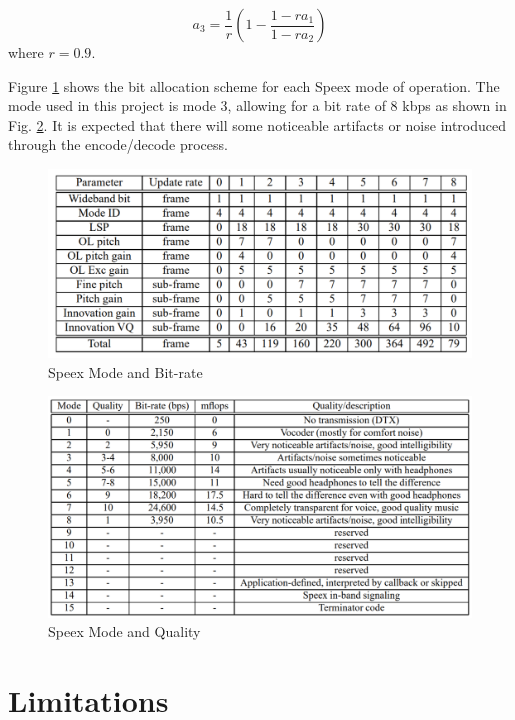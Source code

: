 \documentclass[letterpaper]{article}
\begin{document}
\begin{equation}\label{supp}
    a_3 = \frac{1}{r}\left(1-\frac{1-ra_1}{1-ra_2}\right)
\end{equation}
where $r = 0.9$.

Figure \ref{bitalloctab} shows the bit allocation scheme for each Speex mode of operation. The mode used in this project is mode 3, allowing for a bit rate of 8 kbps as shown in Fig. \ref{qualtab}. It is expected that there will some noticeable artifacts or noise introduced through the encode/decode process.

\begin{figure}[h!]
    \centering
    \includegraphics[width=12cm]{bitalloctable}
    \caption{Speex Mode and Bit-rate~\cite{valin2007speex}}
    \label{bitalloctab}
\end{figure}

\begin{figure}[h!]
    \centering
    \includegraphics[width=12cm]{qualitytable}
    \caption{Speex Mode and Quality~\cite{valin2007speex}}
    \label{qualtab}
\end{figure}

\newpage

\section{Limitations}
\end{document}
